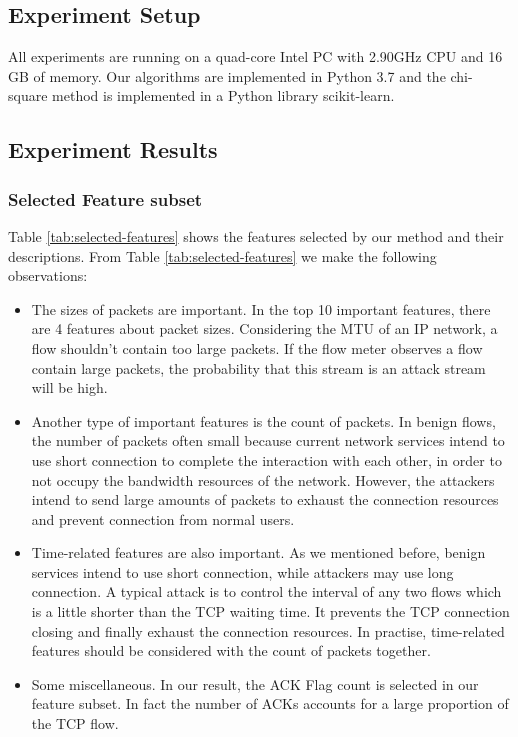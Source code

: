 \documentclass[journal]{IEEEtran}
\begin{document}
\subsection{Experiment Setup}

All experiments are running on a quad-core Intel PC with 2.90GHz CPU and 16 GB of memory. Our algorithms are implemented in Python 3.7 and the chi-square method is implemented in a Python library scikit-learn\cite{sklearn}.

\subsection{Experiment Results}

\subsubsection{Selected Feature subset}

Table \ref{tab:selected-features} shows the features selected by our method and their descriptions. From Table \ref{tab:selected-features} we make the following observations:

\begin{itemize}
	\item The sizes of packets are important. In the top 10 important features, there are 4 features about packet sizes. Considering the MTU of an IP network, a flow shouldn’t contain too large packets. If the flow meter observes a flow contain large packets, the probability that this stream is an attack stream will be high. 
    \item Another type of important features is the count of packets. In benign flows, the number of packets often small because current network services intend to use short connection to complete the interaction with each other, in order to not occupy the bandwidth resources of the network. However, the attackers intend to send large amounts of packets to exhaust the connection resources and prevent connection from normal users. 
    \item Time-related features are also important. As we mentioned before, benign services intend to use short connection, while attackers may use long connection. A typical attack is to control the interval of any two flows which is a little shorter than the TCP waiting time. It prevents the TCP connection closing and finally exhaust the connection resources. In practise, time-related features should be considered with the count of packets together.
    \item Some miscellaneous. In our result, the ACK Flag count is selected in our feature subset. In fact the number of ACKs accounts for a large proportion of the TCP flow. %
\end{itemize} 
\end{document}
